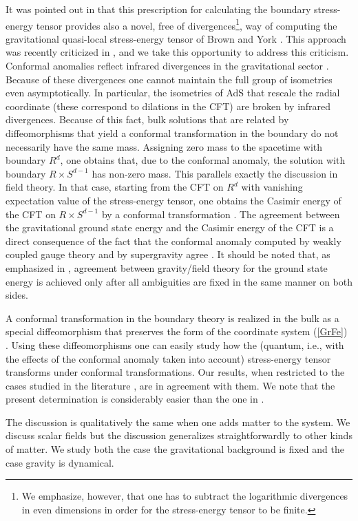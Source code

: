 \documentclass{article}
\begin{document}
It was pointed out in \cite{BK} that this prescription for 
calculating the boundary stress-energy tensor  
provides also a novel, free of divergences\footnote{
We emphasize, however, that one 
has to subtract the logarithmic divergences in even dimensions
in order for the stress-energy tensor to be finite.},
way of computing the gravitational quasi-local 
stress-energy tensor of Brown and York \cite{BrownYork}.
This approach was recently criticized in \cite{AshDas},
and we take this opportunity to address this criticism.
Conformal anomalies reflect infrared divergences 
in the gravitational sector \cite{HS}. 
Because of these divergences
one cannot maintain the full group of isometries even asymptotically.
In particular, the isometries of AdS that rescale the radial 
coordinate (these correspond to dilations in the CFT) 
are broken by infrared divergences. 
Because of this fact, 
bulk solutions that are related by diffeomorphisms that
yield a conformal transformation in the boundary do not 
necessarily have the same mass. Assigning zero mass 
to the spacetime with boundary $R^d$,
one obtains that, due to the conformal anomaly,
the solution with boundary $R \times S^{d-1}$ has 
non-zero mass. This parallels exactly the discussion 
in field theory. In that case, starting from the 
CFT on $R^d$ with vanishing expectation value
of the stress-energy tensor, one obtains 
the Casimir energy of the CFT on $R \times S^{d-1}$
by a conformal transformation \cite{CC}. The
agreement between the gravitational ground state energy 
and the Casimir energy of the CFT is a direct consequence
of the fact that the conformal anomaly 
computed by weakly coupled gauge theory and by 
supergravity agree \cite{HS}. It should be noted that, 
as emphasized in \cite{BK}, agreement between gravity/field
theory for the ground state energy is achieved only after
all ambiguities are fixed in the same manner on both
sides.
 
A conformal transformation in the boundary theory is realized in the bulk as a 
special diffeomorphism that preserves the form
of the coordinate system (\ref{GrFe}) \cite{ISTY}.
Using these diffeomorphisms one can easily study 
how the (quantum, i.e., with the effects of the 
conformal anomaly taken into account) stress-energy 
tensor transforms under conformal transformations.
Our results, when restricted to the
cases studied in the literature \cite{CC},
are in agreement with them. We note that the present 
determination is considerably easier than the one in \cite{CC}.

The discussion is qualitatively the same when one 
adds matter to the system. We discuss 
scalar fields but the discussion generalizes straightforwardly
to other kinds of matter. We study both the case the 
gravitational background is fixed and the case
gravity is dynamical. 
\end{document}

